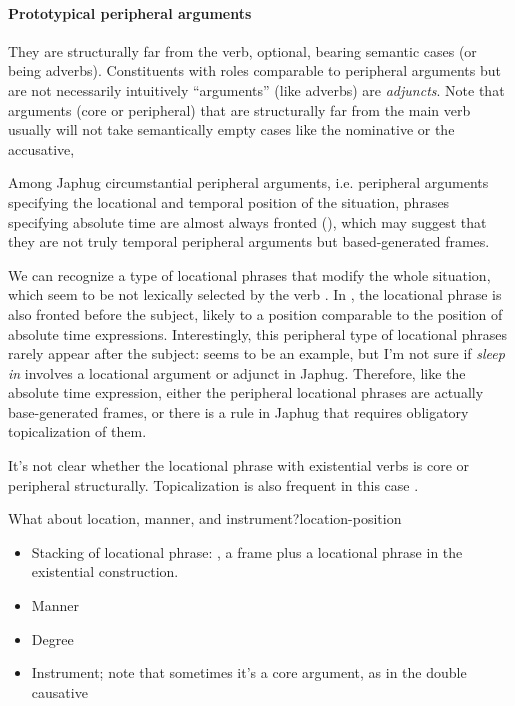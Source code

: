 \documentclass[a4paper, oneside, 12pt]{report}
\newcommand*{\citepage}[1]{p.~{#1}}
\newcommand*{\term}[1]{\emph{#1}}
\newcommand{\form}[1]{\emph{#1}}
\begin{document}
\paragraph*{Prototypical peripheral arguments}
They are structurally far from the verb,
optional, bearing semantic cases (or being adverbs).
Constituents with roles comparable to peripheral arguments 
but are not necessarily intuitively ``arguments'' (like adverbs)
are \term{adjuncts}.
Note that arguments (core or peripheral) that are structurally far from the main verb
usually will not take semantically empty cases like the nominative or the accusative,%

Among Japhug circumstantial peripheral arguments,
i.e. peripheral arguments specifying the locational and temporal position of the situation,
phrases specifying absolute time are almost always fronted
(),
which may suggest that they are not truly temporal peripheral arguments 
but based-generated frames.

We can recognize a type of locational phrases that modify the whole situation,
which seem to be not lexically selected by the verb
\citep[\citepage{304}, (33); \citepage{387}, (66); \citepage{639}, (31)]{jacques2021grammar}.
In \citet[\citepage{387}, (66)]{jacques2021grammar},
the locational phrase is also fronted before the subject,
likely to a position comparable to the position of absolute time expressions.
Interestingly, this peripheral type of locational phrases
rarely appear after the subject:
\citep[\citepage{1220}, (115)]{jacques2021grammar} seems to be an example,
but I'm not sure if \form{sleep in} involves a locational argument or adjunct in Japhug. 
Therefore, like the absolute time expression,
either the peripheral locational phrases are actually base-generated frames,
or there is a rule in Japhug that requires obligatory topicalization of them. 

It's not clear whether the locational phrase with existential verbs 
is core or peripheral structurally.
Topicalization is also frequent in this case \citealt[\citepage{369}, (9)]{jacques2021grammar}.

\begin{todobox}{What about location, manner, and instrument?}{location-position}
    \begin{itemize}        
        \item Stacking of locational phrase:
        \citet[\citepage{284}, (125)]{jacques2021grammar},
        a frame plus a locational phrase in the existential construction.
        \item Manner
        \item Degree
        \item Instrument; note that sometimes it's a core argument, as in the double causative
    \end{itemize}    
\end{todobox}
\end{document}
